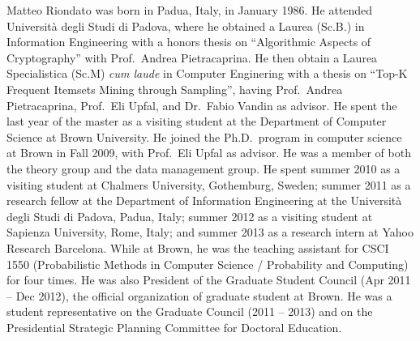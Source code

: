 Matteo Riondato was born in Padua, Italy, in January 1986. He attended
Universit\`a degli Studi di Padova, where he obtained a Laurea (Sc.B.) in Information
Engineering with a honors thesis on ``Algorithmic Aspects of Cryptography'' with
Prof.~Andrea Pietracaprina. He then obtain a Laurea Specialistica (Sc.M)
\emph{cum laude} in Computer Enginering with a thesis on ``Top-K Frequent
Itemsets Mining through Sampling'', having Prof.~Andrea Pietracaprina, Prof.~Eli
Upfal, and Dr.~Fabio Vandin as advisor. He spent the last year of the master as
a visiting student at the Department of Computer Science at Brown University. He
joined the Ph.D.~program in computer science at Brown in Fall 2009, with
Prof.~Eli Upfal as advisor. He was a member of both the theory group and the
data management group. He spent summer 2010 as a visiting student at Chalmers
University, Gothemburg, Sweden; summer 2011 as a research fellow at the
Department of Information Engineering at the Universit\`a degli Studi di Padova,
Padua, Italy; summer 2012 as a visiting student at Sapienza University, Rome,
Italy; and summer 2013 as a research intern at Yahoo Research Barcelona. While
at Brown, he was the teaching assistant for CSCI 1550 (Probabilistic Methods in
Computer Science / Probability and Computing) for four times. He was also
President of the Graduate Student Council (Apr 2011 -- Dec 2012), the official
organization of graduate student at Brown. He was a student representative on
the Graduate Council (2011 -- 2013) and on the Presidential Strategic Planning
Committee for Doctoral Education.

